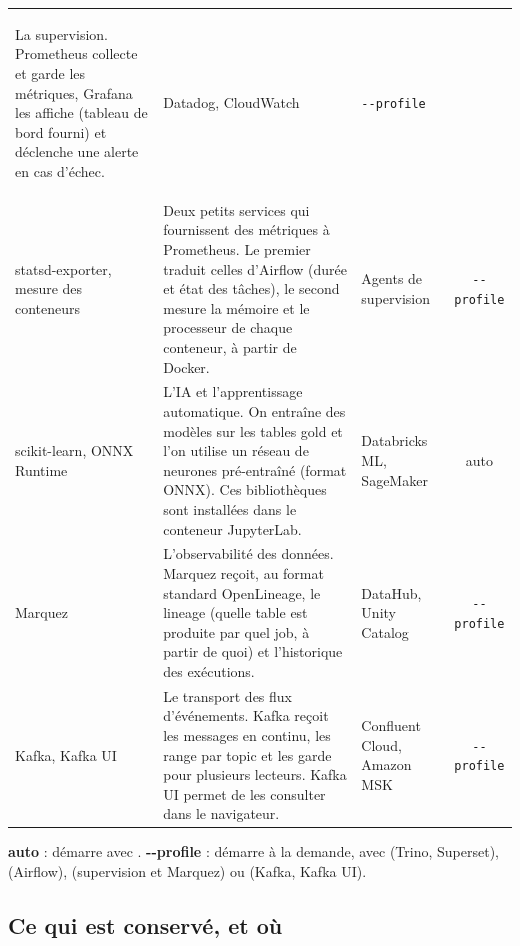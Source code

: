 {\begin{xltabular}{\textwidth}{@{}>{\bfseries\raggedright\arraybackslash}p{2.9cm}
  >{\raggedright\arraybackslash}X >{\raggedright\arraybackslash}p{3.2cm} c@{}}
  La supervision. Prometheus collecte et garde les métriques, Grafana les affiche
  (tableau de bord fourni) et déclenche une alerte en cas d'échec. &
  Datadog, CloudWatch & \texttt{-{}-profile} \\
statsd-exporter, mesure des conteneurs &
  Deux petits services qui fournissent des métriques à Prometheus. Le premier traduit celles
  d'Airflow (durée et état des tâches), le second mesure la mémoire et le processeur de chaque
  conteneur, à partir de Docker. &
  Agents de supervision & \texttt{-{}-profile} \\
scikit-learn, ONNX Runtime &
  L'IA et l'apprentissage automatique. On entraîne des modèles sur les tables gold et l'on
  utilise un réseau de neurones pré-entraîné (format ONNX). Ces bibliothèques sont installées dans
  le conteneur JupyterLab. &
  Databricks ML, SageMaker & auto \\
Marquez &
  L'observabilité des données. Marquez reçoit, au format standard OpenLineage, le lineage
  (quelle table est produite par quel job, à partir de quoi) et l'historique des exécutions. &
  DataHub, Unity Catalog & \texttt{-{}-profile} \\
Kafka, Kafka UI &
  Le transport des flux d'événements. Kafka reçoit les messages en continu, les range par topic et
  les garde pour plusieurs lecteurs. Kafka UI permet de les consulter dans le navigateur. &
  Confluent Cloud, Amazon MSK & \texttt{-{}-profile} \\
\end{xltabular}

\smallskip
{\footnotesize \textbf{auto} : démarre avec . \quad
\textbf{-{}-profile} : démarre à la demande, avec 
(Trino, Superset),  (Airflow), 
(supervision et Marquez) ou  (Kafka, Kafka UI).}
}


\subsection*{Ce qui est conservé, et où}

